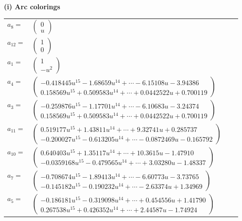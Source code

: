 \documentclass[1p]{elsarticle_modified}
\theoremstyle{definition}
\begin{document}
\flushleft \textbf{(i) Arc colorings}\\
\begin{tabular}{m{7pt} m{180pt} m{7pt} m{180pt} }
\flushright $a_{8}=$&$\begin{pmatrix}0\\u\end{pmatrix}$ \\
\flushright $a_{12}=$&$\begin{pmatrix}1\\0\end{pmatrix}$ \\
\flushright $a_{1}=$&$\begin{pmatrix}1\\- u^2\end{pmatrix}$ \\
\flushright $a_{4}=$&$\begin{pmatrix}-0.418445 u^{15}-1.68659 u^{14}+\cdots-6.15108 u-3.94386\\0.158569 u^{15}+0.509583 u^{14}+\cdots+0.0442522 u+0.700119\end{pmatrix}$ \\
\flushright $a_{3}=$&$\begin{pmatrix}-0.259876 u^{15}-1.17701 u^{14}+\cdots-6.10683 u-3.24374\\0.158569 u^{15}+0.509583 u^{14}+\cdots+0.0442522 u+0.700119\end{pmatrix}$ \\
\flushright $a_{11}=$&$\begin{pmatrix}0.519177 u^{15}+1.43811 u^{14}+\cdots+9.32741 u+0.285737\\-0.200027 u^{15}-0.613205 u^{14}+\cdots-0.0872469 u-0.165792\end{pmatrix}$ \\
\flushright $a_{10}=$&$\begin{pmatrix}0.640403 u^{15}+1.35117 u^{14}+\cdots+10.3615 u-1.47910\\-0.0359168 u^{15}-0.479565 u^{14}+\cdots+3.03280 u-1.48337\end{pmatrix}$ \\
\flushright $a_{7}=$&$\begin{pmatrix}-0.708674 u^{15}-1.89413 u^{14}+\cdots-6.60773 u-3.73765\\-0.145182 u^{15}-0.190232 u^{14}+\cdots-2.63374 u+1.34969\end{pmatrix}$ \\
\flushright $a_{5}=$&$\begin{pmatrix}-0.186181 u^{15}-0.319098 u^{14}+\cdots+0.454556 u+1.41790\\0.267538 u^{15}+0.426352 u^{14}+\cdots+2.44587 u-1.74924\end{pmatrix}$ \\

\end{tabular}
\end{document}
